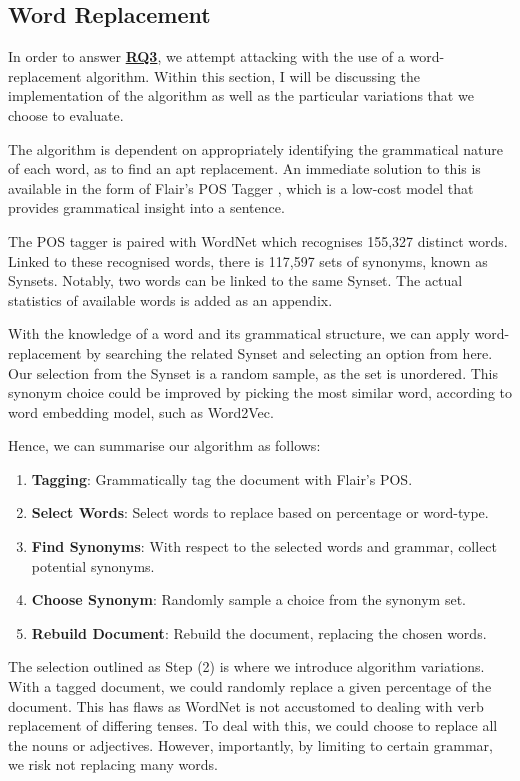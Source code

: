\documentclass{l4proj}
\theoremstyle{definition}
\begin{document}
    \subsection{Word Replacement}
        In order to answer \hyperref[sec:research-questions]{\textbf{RQ3}}, we attempt attacking with the use of a word-replacement algorithm. Within this section, I will be discussing the implementation of the algorithm as well as the particular variations that we choose to evaluate.

        The algorithm is dependent on appropriately identifying the grammatical nature of each word, as to find an apt replacement. An immediate solution to this is available in the form of Flair's POS Tagger \citep{akbik2018coling}, which is a low-cost model that provides grammatical insight into a sentence.

        The POS tagger is paired with WordNet \citep{wordnet1998fellbaum} which recognises 155,327 distinct words. Linked to these recognised words, there is 117,597 sets of synonyms, known as Synsets. Notably, two words can be linked to the same Synset. The actual statistics of available words is added as an appendix.

        With the knowledge of a word and its grammatical structure, we can apply word-replacement by searching the related Synset and selecting an option from here. Our selection from the Synset is a random sample, as the set is unordered. This synonym choice could be improved by picking the most similar word, according to word embedding model, such as Word2Vec.

        Hence, we can summarise our algorithm as follows:
        \begin{enumerate}
            \item \textbf{Tagging}: Grammatically tag the document with Flair's POS.
            \item \textbf{Select Words}: Select words to replace based on percentage or word-type.
            \item \textbf{Find Synonyms}: With respect to the selected words and grammar, collect potential synonyms.
            \item \textbf{Choose Synonym}: Randomly sample a choice from the synonym set.
            \item \textbf{Rebuild Document}: Rebuild the document, replacing the chosen words.
        \end{enumerate}

        The selection outlined as Step (2) is where we introduce algorithm variations. With a tagged document, we could randomly replace a given percentage of the document. This has flaws as WordNet is not accustomed to dealing with verb replacement of differing tenses. To deal with this, we could choose to replace all the nouns or adjectives. However, importantly, by limiting to certain grammar, we risk not replacing many words.
\end{document}
